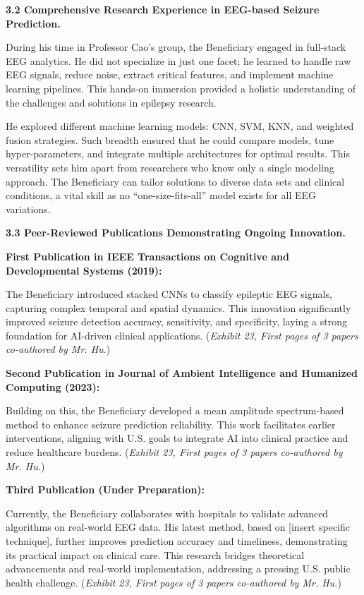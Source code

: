 \documentclass{article}
\begin{document}
{\bf 3.2 Comprehensive Research Experience in EEG-based Seizure Prediction.}

During his time in Professor Cao’s group, the Beneficiary engaged in full-stack EEG analytics. He did not specialize in just one facet; he learned to handle raw EEG signals, reduce noise, extract critical features, and implement machine learning pipelines. This hands-on immersion provided a holistic understanding of the challenges and solutions in epilepsy research.

He explored different machine learning models: CNN, SVM, KNN, and weighted fusion strategies. Such breadth ensured that he could compare models, tune hyper-parameters, and integrate multiple architectures for optimal results. This versatility sets him apart from researchers who know only a single modeling approach. The Beneficiary can tailor solutions to diverse data sets and clinical conditions, a vital skill as no “one-size-fits-all” model exists for all EEG variations.


{\bf 3.3 Peer-Reviewed Publications Demonstrating Ongoing Innovation.}

{\bf First Publication in IEEE Transactions on Cognitive and Developmental Systems (2019):}

The Beneficiary introduced stacked CNNs to classify epileptic EEG signals, capturing complex temporal and spatial dynamics. This innovation significantly improved seizure detection accuracy, sensitivity, and specificity, laying a strong foundation for AI-driven clinical applications. ({\it Exhibit 23, First pages of 3 papers co-authored by Mr. Hu.})

{\bf Second Publication in Journal of Ambient Intelligence and Humanized Computing (2023):}

Building on this, the Beneficiary developed a mean amplitude spectrum-based method to enhance seizure prediction reliability. This work facilitates earlier interventions, aligning with U.S. goals to integrate AI into clinical practice and reduce healthcare burdens. ({\it Exhibit 23, First pages of 3 papers co-authored by Mr. Hu.})

{\bf Third Publication (Under Preparation): }

Currently, the Beneficiary collaborates with hospitals to validate advanced algorithms on real-world EEG data. His latest method, based on [insert specific technique], further improves prediction accuracy and timeliness, demonstrating its practical impact on clinical care. This research bridges theoretical advancements and real-world implementation, addressing a pressing U.S. public health challenge. ({\it Exhibit 23, First pages of 3 papers co-authored by Mr. Hu.})
\end{document}
